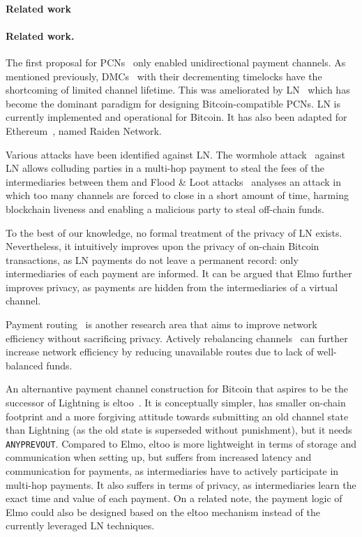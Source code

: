 \makeatletter%
%
  {\paragraph{Related work}}%
  {\paragraph{Related work.}}%
\makeatother%
 The first proposal for PCNs~\cite{spilman} only enabled
 unidirectional payment channels. As mentioned previously, DMCs~\cite{decker}
 with their decrementing timelocks have the shortcoming of limited channel
 lifetime. This was ameliorated by LN~\cite{lightning} which has become the dominant paradigm for designing Bitcoin-compatible PCNs.
 LN is currently implemented and operational for
  Bitcoin. It has also been adapted for Ethereum~\cite{wood2014ethereum}, named Raiden Network.

Various attacks have been identified against LN. The wormhole
  attack~\cite{DBLP:conf/ndss/MalavoltaMSKM19} against LN allows
  colluding parties in a multi-hop payment to steal the fees of the
  intermediaries between them and Flood \& Loot attacks~\cite{10.1145/3419614.3423248}
  analyses an attack in which too many channels are forced to
  close in a short amount of time, harming blockchain liveness and enabling
  a malicious party to steal off-chain funds.

  To the best of our knowledge, no formal treatment of the privacy of LN exists.
  Nevertheless, it intuitively improves upon the privacy of on-chain Bitcoin
  transactions, as LN payments do not leave a permanent record: only
  intermediaries of each payment are informed. It can be argued that Elmo
  further improves privacy, as payments are hidden from
  the intermediaries of a virtual channel.

  Payment routing~\cite{spider,prihodko2016flare,lee2020routee} is another research area that aims to improve network efficiency without sacrificing  privacy. Actively rebalancing channels~\cite{DBLP:conf/ccs/KhalilG17} can
  further increase network efficiency by reducing unavailable routes due to lack of well-balanced funds.

  An alternantive payment channel construction for Bitcoin that aspires to be
  the successor of Lightning is eltoo~\cite{eltoo}. It is conceptually simpler,
  has smaller on-chain footprint and a more forgiving attitude towards
  submitting an old channel state than Lightning (as the old state is superseded without punishment), but it needs
  \texttt{ANYPREVOUT}. Compared to Elmo, eltoo is more lightweight in terms of
  storage and communication when setting up, but suffers from increased latency
  and communication for payments, as intermediaries have to actively participate
  in multi-hop payments. It also suffers in terms of privacy, as intermediaries
  learn the exact time and value of each payment. On a related note, the payment
  logic of Elmo could also be designed based on the eltoo mechanism instead of
  the currently leveraged LN techniques.

